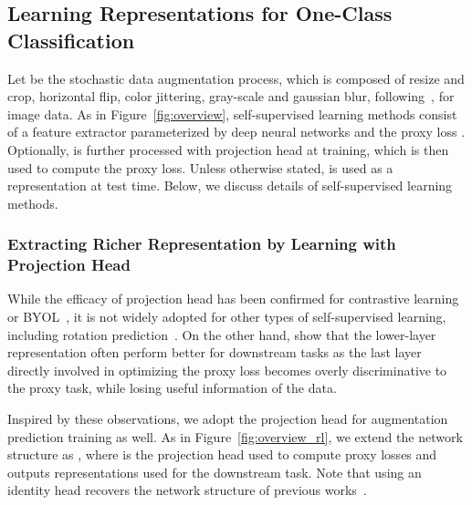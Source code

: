 \documentclass{article} \usepackage{iclr2021_conference,times}
\begin{document}
\vspace{-0.05in}
\subsection{Learning Representations for One-Class Classification}
\label{sec:selfsup}
\vspace{-0.05in}
Let  be the stochastic data augmentation process, which is composed of resize and crop, horizontal flip, color jittering, gray-scale and gaussian blur, following~\citep{chen2020simple}, for image data. As in Figure~\ref{fig:overview}, self-supervised learning methods consist of a feature extractor  parameterized by deep neural networks and the proxy loss . Optionally,  is further processed with projection head  at training, which is then used to compute the proxy loss. Unless otherwise stated,  is used as a representation at test time. Below, we discuss details of self-supervised learning methods.




\subsubsection{Extracting Richer Representation by Learning with Projection Head} 
\label{sec:representation_mlp_head}
\vspace{-0.05in}


While the efficacy of projection head has been confirmed for contrastive learning~\citep{chen2020simple} or BYOL~\citep{grill2020bootstrap}, it is not widely adopted for other types of self-supervised learning, including rotation prediction~\citep{gidaris2018unsupervised}. On the other hand, \citet{gidaris2018unsupervised} show that the lower-layer representation often perform better for downstream tasks as the last layer directly involved in optimizing the proxy loss becomes overly discriminative to the proxy task, while losing useful information of the data.




Inspired by these observations, we adopt the projection head for augmentation prediction training as well. As in Figure~\ref{fig:overview_rl}, we extend the network structure as , where  is the projection head used to compute proxy losses and  outputs representations used for the downstream task. Note that using an identity head  recovers the network structure of previous works~\citep{gidaris2018unsupervised,golan2018deep,hendrycks2019using}.
\end{document}
